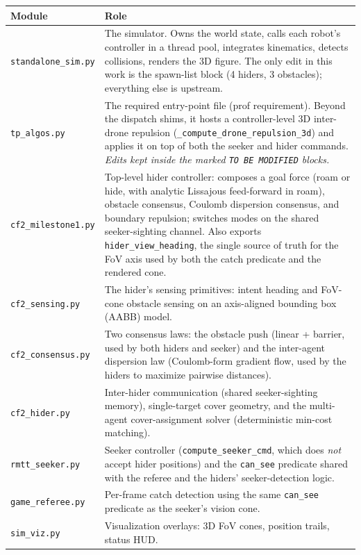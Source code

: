 \documentclass[11pt,a4paper]{article}
\newcommand{\code}[1]{\texttt{#1}}
\begin{document}
\begin{longtable}{p{4cm}p{10cm}}
\toprule
\textbf{Module} & \textbf{Role} \\
\midrule
\code{standalone\_sim.py} & The simulator. Owns the world state, calls each
robot's controller in a thread pool, integrates kinematics, detects
collisions, renders the 3D figure. The only edit in this work is the
spawn-list block (4 hiders, 3 obstacles); everything else is upstream. \\
\code{tp\_algos.py} & The required entry-point file (prof requirement). Beyond
the dispatch shims, it hosts a controller-level 3D inter-drone repulsion
(\code{\_compute\_drone\_repulsion\_3d}) and applies it on top of both the
seeker and hider commands. \emph{Edits kept inside the marked
\code{TO BE MODIFIED} blocks.} \\
\code{cf2\_milestone1.py} & Top-level hider controller: composes a goal force
(roam or hide, with analytic Lissajous feed-forward in roam), obstacle
consensus, Coulomb dispersion consensus, and boundary repulsion; switches
modes on the shared seeker-sighting channel. Also exports
\code{hider\_view\_heading}, the single source of truth for the FoV axis
used by both the catch predicate and the rendered cone. \\
\code{cf2\_sensing.py} & The hider's sensing primitives: intent heading and
FoV-cone obstacle sensing on an axis-aligned bounding box (AABB) model. \\
\code{cf2\_consensus.py} & Two consensus laws: the obstacle push (linear +
barrier, used by both hiders and seeker) and the inter-agent dispersion law
(Coulomb-form gradient flow, used by the hiders to maximize pairwise
distances). \\
\code{cf2\_hider.py} & Inter-hider communication (shared seeker-sighting
memory), single-target cover geometry, and the multi-agent cover-assignment
solver (deterministic min-cost matching). \\
\code{rmtt\_seeker.py} & Seeker controller (\code{compute\_seeker\_cmd},
which does \emph{not} accept hider positions) and the \code{can\_see}
predicate shared with the referee and the hiders' seeker-detection logic. \\
\code{game\_referee.py} & Per-frame catch detection using the same
\code{can\_see} predicate as the seeker's vision cone. \\
\code{sim\_viz.py} & Visualization overlays: 3D FoV cones, position trails,
status HUD. \\
\bottomrule
\end{longtable}
\end{document}
